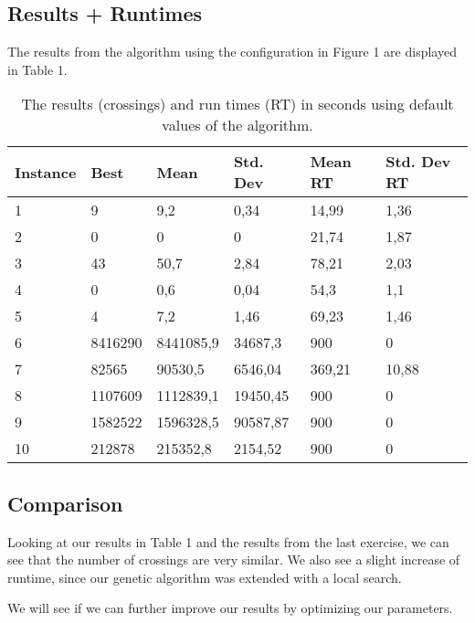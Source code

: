 \documentclass [11pt]{article}
\begin{document}
\subsection{Results + Runtimes}

The results from the algorithm using the configuration in Figure 1 are displayed in Table 1.


\begin{table}[]
\centering
\caption{The results (crossings) and run times (RT) in seconds using default values of the algorithm.}
\label{my-label}
\begin{tabular}{|l|l|l|l|l|l|}
\hline
Instance & Best    & Mean      & Std. Dev & Mean RT & Std. Dev RT \\ \hline
1        & 9       & 9,2       & 0,34     & 14,99   & 1,36        \\ \hline
2        & 0       & 0         & 0        & 21,74   & 1,87        \\ \hline
3        & 43      & 50,7      & 2,84     & 78,21   & 2,03        \\ \hline
4        & 0       & 0,6       & 0,04     & 54,3    & 1,1         \\ \hline
5        & 4       & 7,2       & 1,46     & 69,23   & 1,46        \\ \hline
6        & 8416290 & 8441085,9 & 34687,3  & 900     & 0           \\ \hline
7        & 82565   & 90530,5   & 6546,04  & 369,21  & 10,88       \\ \hline
8        & 1107609 & 1112839,1 & 19450,45 & 900     & 0           \\ \hline
9        & 1582522 & 1596328,5 & 90587,87 & 900     & 0           \\ \hline
10       & 212878  & 215352,8  & 2154,52  & 900     & 0           \\ \hline
\end{tabular}
\end{table}


\subsection{Comparison}


Looking at our results in Table 1 and the results from the last exercise, we can see that the number of crossings are very similar. We also see a slight increase of runtime, since our genetic algorithm was extended with a local search.

We will see if we can further improve our results by optimizing our parameters.
\end{document}

